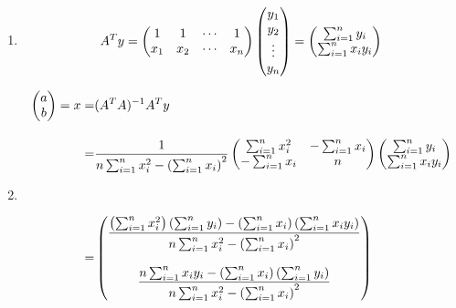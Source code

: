 \begin{frame}[fragile]

	\begin{enumerate}
		\item[]
	\[
	A^T y =	\begin{pmatrix}
		1 & 1 & \cdots & 1\cr
		x_1 & x_2 & \cdots & x_n \cr
\end{pmatrix}
\begin{pmatrix}
	y_1\cr
	y_2\cr
	\vdots\cr
	y_n\cr
\end{pmatrix} =
\begin{pmatrix}
	\sum_{i=1}^n y_i \cr
	\sum_{i=1}^n x_iy_i \cr
\end{pmatrix}
	\]
	\vfill
\item[]
	\begin{align*}
		\begin{pmatrix}
			a\cr
			b\cr
		\end{pmatrix}=
x =&
(A^TA)^{-1}A^T y\\[1em]
		=&
\frac{1}{n\sum_{i=1}^n x_i^2-\left(\sum_{i=1}^n x_i\right)^2}
\begin{pmatrix}
	\sum_{i=1}^n x_i^2
 & -\sum_{i=1}^n x_i\cr
	-\sum_{i=1}^n x_i & n
\end{pmatrix}
\begin{pmatrix}
	\sum_{i=1}^n y_i \cr
	\sum_{i=1}^n x_iy_i \cr
\end{pmatrix}\\[3em]
		 =&
		 \begin{pmatrix}
			 \displaystyle
			 \frac{\left(\sum_{i=1}^n x_i^2\right)\left( \sum_{i=1}^n y_i\right) - \left(\sum_{i=1}^n x_i\right)\left(\sum_{i=1}^n x_iy_i\right)}{n\sum_{i=1}^n x_i^2-\left(\sum_{i=1}^n x_i\right)^2} \\[2em]
			 \displaystyle
\frac{n\sum_{i=1}^n x_iy_i - \left(\sum_{i=1}^n x_i\right)\left(\sum_{i=1}^n y_i\right)}{n\sum_{i=1}^n x_i^2-\left(\sum_{i=1}^n x_i\right)^2} \cr
		 \end{pmatrix}
	\end{align*}
	\end{enumerate}
\end{frame}
